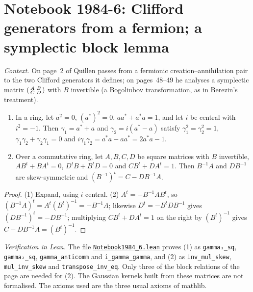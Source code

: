 \section[Notebook 1984-6: fermions and Clifford generators; a symplectic block lemma]{Notebook 1984-6: Clifford generators from a fermion; a symplectic block lemma\protect{}}\label{sec:quillen-1984-6}

\emph{Context.} On page~2 of  Quillen passes from a fermionic creation--annihilation pair to the two Clifford generators it defines; on pages~48--49 he analyses a symplectic matrix $\begin{psmallmatrix} A & B\\ C & D\end{psmallmatrix}$ with $B$ invertible (a Bogoliubov transformation, as in Berezin's treatment).

\begin{encadre}
\begin{theoreme}\label{thm:quillen-1984-6}\leavevmode
\begin{enumerate}
\item In a ring, let $a^2 = 0$, $(a^*)^2 = 0$, $aa^* + a^*a = 1$, and let $i$ be central with $i^2 = -1$. Then $\gamma_1 = a^* + a$ and $\gamma_2 = i(a^* - a)$ satisfy $\gamma_1^2 = \gamma_2^2 = 1$, $\gamma_1\gamma_2 + \gamma_2\gamma_1 = 0$ and $i\gamma_1\gamma_2 = a^*a - aa^* = 2a^*a - 1$.
\item Over a commutative ring, let $A, B, C, D$ be square matrices with $B$ invertible, $AB^t + BA^t = 0$, $D^tB + B^tD = 0$ and $CB^t + DA^t = 1$. Then $B^{-1}A$ and $DB^{-1}$ are skew-symmetric and $(B^{-1})^t = C - DB^{-1}A$.
\end{enumerate}
\end{theoreme}
\end{encadre}

\begin{proof}
(1) Expand, using $i$ central. (2) $A^t = -B^{-1}AB^t$, so $(B^{-1}A)^t = A^t(B^t)^{-1} = -B^{-1}A$; likewise $D^t = -B^tDB^{-1}$ gives $(DB^{-1})^t = -DB^{-1}$; multiplying $CB^t + DA^t = 1$ on the right by $(B^t)^{-1}$ gives $C - DB^{-1}A = (B^t)^{-1}$.
\end{proof}

\emph{Verification in Lean.} The file \href{\leanblobmain/Notebook1984_6.lean}{\texttt{Notebook1984\_6.\allowbreak{}lean}} proves (1) as \texttt{gamma₁\_sq}, \texttt{gamma₂\_sq}, \texttt{gamma\_anticomm} and \texttt{i\_gamma\_gamma}, and (2) as \texttt{inv\_mul\_skew}, \texttt{mul\_inv\_skew} and \texttt{transpose\_inv\_eq}. Only three of the block relations of the page are needed for (2). The Gaussian kernels built from these matrices are not formalised. The axioms used are the three usual axioms of mathlib.

